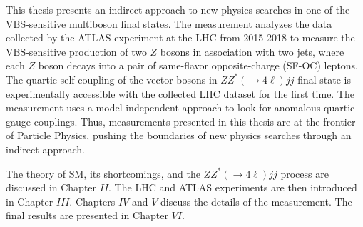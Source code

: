 This thesis presents an indirect approach to new physics searches in one of the VBS-sensitive multiboson final states. The measurement analyzes the data collected by the ATLAS experiment at the LHC from 2015-2018 to measure the VBS-sensitive production of two $Z$ bosons in association with two jets, where each $Z$ boson decays into a pair of same-flavor opposite-charge (SF-OC) leptons. The quartic self-coupling of the vector bosons in $ZZ^*(\rightarrow 4\ell)jj$ final state is experimentally accessible with the collected LHC dataset for the first time. The measurement uses a model-independent approach to look for anomalous quartic gauge couplings. Thus, measurements presented in this thesis are at the frontier of Particle Physics, pushing the boundaries of new physics searches through an indirect approach. 

The theory of SM, its shortcomings, and the $ZZ^*(\rightarrow 4\ell)jj$ process are discussed in Chapter $II$. The LHC and ATLAS experiments are then introduced in Chapter $III$. Chapters $IV$ and $V$ discuss the details of the measurement. The final results are presented in Chapter $VI$. 
